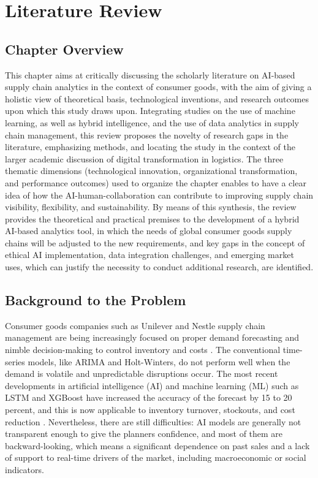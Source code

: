 \chapter{Literature Review}\label{ch:Background}

\section{Chapter Overview}

This chapter aims at critically discussing the scholarly literature on AI-based supply chain analytics in the context of consumer goods, with the aim of giving a holistic view of theoretical basis, technological inventions, and research outcomes upon which this study draws upon. Integrating studies on the use of machine learning, as well as hybrid intelligence, and the use of data analytics in supply chain management, this review proposes the novelty of research gaps in the literature, emphasizing methods, and locating the study in the context of the larger academic discussion of digital transformation in logistics. The three thematic dimensions (technological innovation, organizational transformation, and performance outcomes) used to organize the chapter enables to have a clear idea of how the AI-human-collaboration can contribute to improving supply chain visibility, flexibility, and sustainability. By means of this synthesis, the review provides the theoretical and practical premises to the development of a hybrid AI-based analytics tool, in which the needs of global consumer goods supply chains will be adjusted to the new requirements, and key gaps in the concept of ethical AI implementation, data integration challenges, and emerging market uses, which can justify the necessity to conduct additional research, are identified.


\section{Background to the Problem}

Consumer goods companies such as Unilever and Nestle supply chain management are being increasingly focused on proper demand forecasting and nimble decision-making to control inventory and costs \autocite{luo_intelligent_2024}. The conventional time-series models, like ARIMA and Holt-Winters, do not perform well when the demand is volatile and unpredictable disruptions occur. The most recent developments in artificial intelligence (AI) and machine learning (ML) such as LSTM and XGBoost have increased the accuracy of the forecast by 15 to 20 percent, and this is now applicable to inventory turnover, stockouts, and cost reduction \autocite{chowdhury_systematic_2025}. Nevertheless, there are still difficulties: AI models are generally not transparent enough to give the planners confidence, and most of them are backward-looking, which means a significant dependence on past sales and a lack of support to real-time drivers of the market, including macroeconomic or social indicators. 


